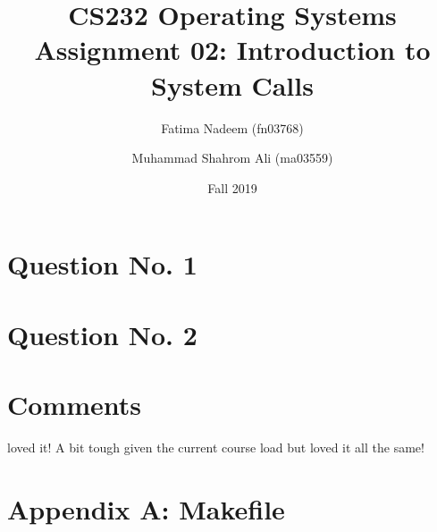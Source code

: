 \documentclass[a4paper]{article}
\begin{document}
\title{CS232 Operating Systems \\ Assignment 02: Introduction to System Calls}
\author{ Fatima Nadeem (fn03768) \and Muhammad Shahrom Ali (ma03559)}
\date{Fall 2019}
\maketitle


\section {Question No. 1}



\newpage

\section {Question No. 2}



\section {Comments}

loved it! A bit tough given the current course load but loved it all the same!

\newpage

\section{Appendix A: Makefile}


\end{document}
